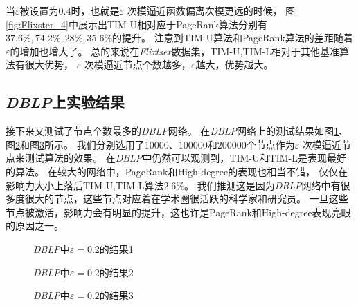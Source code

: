 当$\varepsilon$被设置为$0.4$时，也就是$\varepsilon$-次模逼近函数偏离次模更远的时候，
图\ref{fig:Flixster_4}中展示出{\sf TIM-U}相对应于{\sf PageRank}算法分别有$37.6\%,74.2\%,28\%,35.6\%$的提升。
注意到{\sf TIM-U}算法和{\sf PageRank}算法的差距随着$\varepsilon$的增加也增大了。
总的来说在{\em Flixtser}数据集，{\sf TIM-U,TIM-L}相对于其他基准算法有很大优势，
$\varepsilon$-次模逼近节点个数越多，$\varepsilon$越大，优势越大。



\subsection{{\em DBLP}上实验结果}

接下来又测试了节点个数最多的{\em DBLP}网络。
在{\em DBLP}网络上的测试结果如图\ref{fig:dblp_2_1}、图\ref{fig:dblp_2_2}和图\ref{fig:dblp_2_3}所示。
我们分别选用了$10000$、$100000$和$200000$个节点作为$\varepsilon$-次模逼近节点来测试算法的效果。
在{\em DBLP}中仍然可以观测到，{\sf TIM-U}和{\sf TIM-L}是表现最好的算法。
在较大的网络中，{\sf PageRank}和{\sf High-degree}的表现也相当不错，
仅仅在影响力大小上落后{\sf TIM-U,TIM-L}算法$2.6\%$。
我们推测这是因为{\em DBLP}网络中有很多度很大的节点，这些节点对应着在学术圈很活跃的科学家和研究员。
一旦这些节点被激活，影响力会有明显的提升，这也许是{\sf PageRank}和{\sf High-degree}表现亮眼的原因之一。



\begin{figure}[h]
\centering
	\caption{{\em DBLP}中$\varepsilon=0.2$的结果1}
	\label{fig:dblp_2_1}
\end{figure}

\begin{figure}[h]
\centering
	\caption{{\em DBLP}中$\varepsilon=0.2$的结果2}
	\label{fig:dblp_2_2}
\end{figure}

\begin{figure}[h]
\centering
	\caption{{\em DBLP}中$\varepsilon=0.2$的结果3}
	\label{fig:dblp_2_3}
\end{figure}

